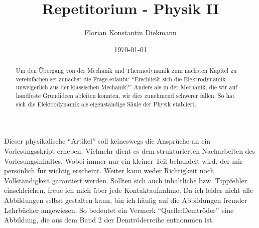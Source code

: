 
\title{Repetitorium - Physik II}
\author{Florian Konstantin Diekmann}
\date{\today}



\maketitle
\vspace{3cm}
\begin{abstract}
Um den Übergang von der Mechanik und Thermodynamik zum nächsten Kapitel zu vereinfachen sei zunächst die Frage erlaubt: "`Erschließt sich die Elektrodynamik unweigerlich aus der klassischen Mechanik?"' Anders als in der Mechanik, die wir auf handfeste Grundideen ableiten konnten, wir dies zunehmend schwerer fallen. So hat sich die Elektrodynamik als eigenständige Säule der Physik etabliert. 
\end{abstract}
  

Dieser physikalische "`Artikel"' soll keineswegs die Ansprüche an ein Vorlesungsskript erheben. Vielmehr dient es  
dem strukturierten Nacharbeiten des Vorlesungsinhaltes. Wobei immer nur ein kleiner Teil behandelt wird, der mir persönlich für wichtig erscheint. Weiter kann weder   Richtigkeit noch  Vollständigkeit  garantiert werden. Sollten sich auch  inhaltliche bzw. Tippfehler einschleichen, freue ich mich über jede Kontaktaufnahme.
Da ich leider nicht alle Abbildungen selbst gestalten kann, bin ich häufig auf die Abbildungen fremder Lehrbücher angewiesen. So bedeutet ein Vermerk "`Quelle:Demtröder"' eine Abbildung, die aus dem Band 2 der Demtröderreihe entnommen ist.
\newpage
\tableofcontents
\newpage
%
%

\newpage

\newpage





